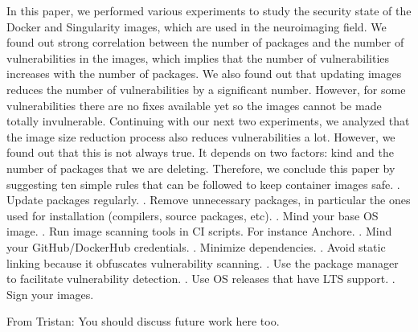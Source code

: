 \documentclass[a4paper,num-refs]{oup-contemporary}
\newcommand{\tristan}[1]{\color{blue}From Tristan: #1\color{black}}
\begin{document}
In this paper, we performed various experiments to study the security state of the Docker
and Singularity images, which are used in the neuroimaging field. We found out strong correlation
between the number of packages and the number of vulnerabilities in the images, which implies
that the number of vulnerabilities increases with the number of packages. We also found out that
updating images reduces the number of vulnerabilities by a significant number. However, for some
vulnerabilities there are no fixes available yet so the images cannot 
be made totally invulnerable. Continuing with our next two experiments, we analyzed that the
image size reduction process also reduces vulnerabilities a lot. However, we found out that this is not
always true. It depends on two factors: kind and the number of packages that we are
deleting. Therefore, we conclude this paper by suggesting ten simple rules that can be
followed to keep container images safe.
. Update packages regularly.
. Remove unnecessary packages, in particular the ones used for installation (compilers, source packages, etc).
. Mind your base OS image.
. Run image scanning tools in CI scripts. For instance Anchore.
. Mind your GitHub/DockerHub credentials.
. Minimize dependencies.
. Avoid static linking because it obfuscates vulnerability scanning.
. Use the package manager to facilitate vulnerability detection.
. Use OS releases that have LTS support.
. Sign your images.

\tristan{You should discuss future work here too.}


\end{document}
